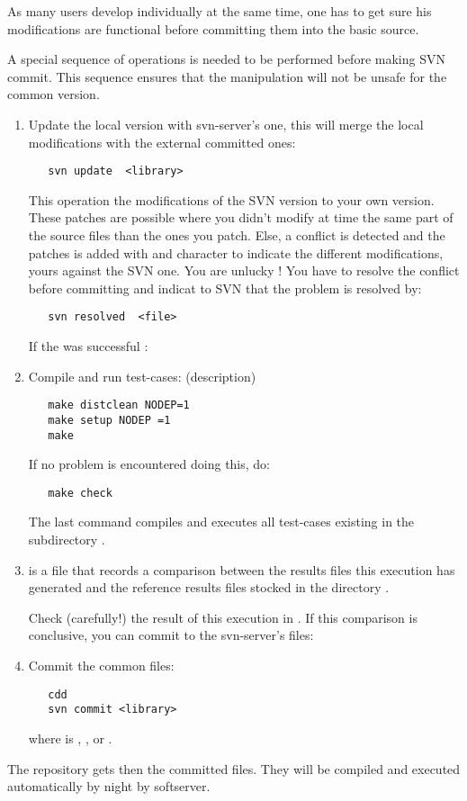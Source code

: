 As many users develop individually at the same time, one has to get
sure his modifications are functional  before
committing them into the basic source.


A special sequence of operations is needed to be performed before
making SVN commit. This sequence ensures that the
manipulation will not be unsafe for the common version.

\begin{enumerate}
\item  Update the local version with svn-server's one, this will merge the local modifications with the external committed ones:
\begin{verbatim}
   svn update  <library>
\end{verbatim}
This operation  the modifications of the SVN version
to your own version. These patches are possible where you didn't
modify at time the same part of the source files than the ones you
patch. Else, a conflict is detected and the patches is added with
\code{+} and \code{-} character to indicate the different
modifications, yours against the SVN one. 
You are unlucky ! You have to resolve the conflict before committing and indicat to SVN that the problem is resolved by:
\begin{verbatim}
   svn resolved  <file>
\end{verbatim}
If the  was successful :
\item  Compile and run test-cases: (description)
\begin{verbatim}
   make distclean NODEP=1
   make setup NODEP =1 
   make
\end{verbatim}

If no problem is encountered doing this, do:

\begin{verbatim}
   make check
\end{verbatim}

The last command compiles and executes all test-cases existing in
the subdirectory .

\item  {} is a file that records a comparison between the results files this execution has
generated and the reference 
results files stocked in the directory . 

Check (carefully!) the result of this execution in
. If this comparison is conclusive, you can
commit to the svn-server's files:

\item  Commit the common files:
\begin{verbatim}
   cdd
   svn commit <library>
\end{verbatim}
where  is , ,  or .
\end{enumerate}

The repository gets then the committed files. They will be compiled and
executed automatically by night by softserver.
